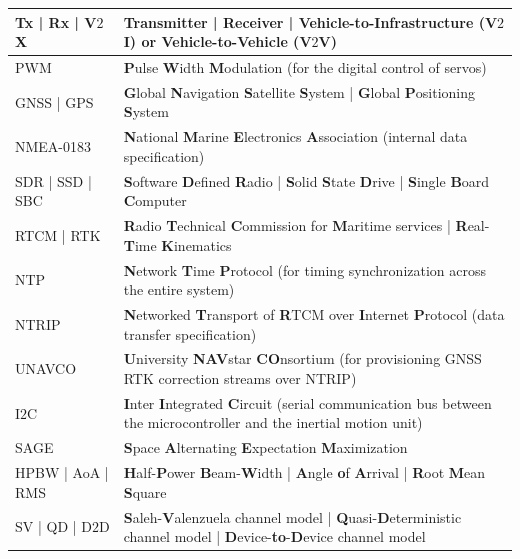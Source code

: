 \documentclass[10pt, twocolumn]{IEEEtran}
\begin{document}
\begin{table} [tb]
	\centering
	\scriptsize
	\begin{tabular}{|l||l|}
		\hline
        Tx | Rx | V$2$X & Transmitter | Receiver | \textbf{V}ehicle-to-\textbf{I}nfrastructure (V$2$I) or \textbf{V}ehicle-to-\textbf{V}ehicle (V$2$V)\\
		\hline
        \hline
        PWM & \textbf{P}ulse \textbf{W}idth \textbf{M}odulation (for the digital control of servos)\\
		\hline
        GNSS | GPS & \textbf{G}lobal \textbf{N}avigation \textbf{S}atellite \textbf{S}ystem | \textbf{G}lobal \textbf{P}ositioning \textbf{S}ystem\\
        \hline
		NMEA-0183 & \textbf{N}ational \textbf{M}arine \textbf{E}lectronics \textbf{A}ssociation (internal data specification)\\
		\hline
        SDR | SSD | SBC & \textbf{S}oftware \textbf{D}efined \textbf{R}adio | \textbf{S}olid \textbf{S}tate \textbf{D}rive | \textbf{S}ingle \textbf{B}oard \textbf{C}omputer\\
		\hline
        RTCM | RTK & \textbf{R}adio \textbf{T}echnical \textbf{C}ommission for \textbf{M}aritime services | \textbf{R}eal-\textbf{T}ime \textbf{K}inematics\\
		\hline
        NTP & \textbf{N}etwork \textbf{T}ime \textbf{P}rotocol (for timing synchronization across the entire system)\\
        \hline
		NTRIP & \textbf{N}etworked \textbf{T}ransport of \textbf{R}TCM over \textbf{I}nternet \textbf{P}rotocol (data transfer specification)\\
		\hline
		UNAVCO & \textbf{U}niversity \textbf{NAV}star \textbf{CO}nsortium (for provisioning GNSS RTK correction streams over NTRIP)\\
		\hline
		I$2$C & \textbf{I}nter \textbf{I}ntegrated \textbf{C}ircuit (serial communication bus between the microcontroller and the inertial motion unit)\\
		\hline
        \hline
        SAGE & \textbf{S}pace \textbf{A}lternating \textbf{E}xpectation \textbf{M}aximization\\
		\hline
        HPBW | AoA | RMS & \textbf{H}alf-\textbf{P}ower \textbf{B}eam-\textbf{W}idth | \textbf{A}ngle \textbf{o}f \textbf{A}rrival | \textbf{R}oot \textbf{M}ean \textbf{S}quare\\
		\hline
        SV | QD | D$2$D & \textbf{S}aleh-\textbf{V}alenzuela channel model | \textbf{Q}uasi-\textbf{D}eterministic channel model | \textbf{D}evice-\textbf{to}-\textbf{D}evice channel model\\

\end{tabular}
\end{table}
\end{document}
